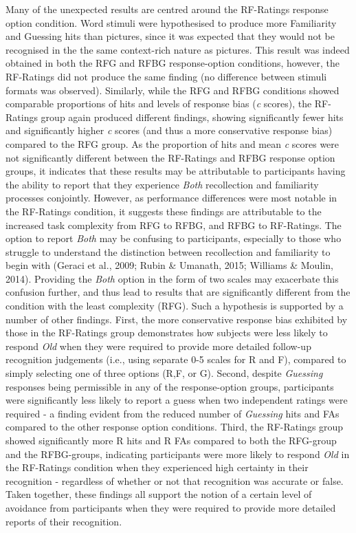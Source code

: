 \documentclass[
  11pt,
]{article}
\begin{document}
Many of the unexpected results are centred around the RF-Ratings
response option condition. Word stimuli were hypothesised to produce
more Familiarity and Guessing hits than pictures, since it was expected
that they would not be recognised in the the same context-rich nature as
pictures. This result was indeed obtained in both the RFG and RFBG
response-option conditions, however, the RF-Ratings did not produce the
same finding (no difference between stimuli formats was observed).
Similarly, while the RFG and RFBG conditions showed comparable
proportions of hits and levels of response bias (\emph{c} scores), the
RF-Ratings group again produced different findings, showing
significantly fewer hits and significantly higher \emph{c} scores (and
thus a more conservative response bias) compared to the RFG group. As
the proportion of hits and mean \emph{c} scores were not significantly
different between the RF-Ratings and RFBG response option groups, it
indicates that these results may be attributable to participants having
the ability to report that they experience \emph{Both} recollection and
familiarity processes conjointly. However, as performance differences
were most notable in the RF-Ratings condition, it suggests these
findings are attributable to the increased task complexity from RFG to
RFBG, and RFBG to RF-Ratings. The option to report \emph{Both} may be
confusing to participants, especially to those who struggle to
understand the distinction between recollection and familiarity to begin
with (Geraci et al., 2009; Rubin \& Umanath, 2015; Williams \& Moulin,
2014). Providing the \emph{Both} option in the form of two scales may
exacerbate this confusion further, and thus lead to results that are
significantly different from the condition with the least complexity
(RFG). Such a hypothesis is supported by a number of other findings.
First, the more conservative response bias exhibited by those in the
RF-Ratings group demonstrates how subjects were less likely to respond
\emph{Old} when they were required to provide more detailed follow-up
recognition judgements (i.e., using separate 0-5 scales for R and F),
compared to simply selecting one of three options (R,F, or G). Second,
despite \emph{Guessing} responses being permissible in any of the
response-option groups, participants were significantly less likely to
report a guess when two independent ratings were required - a finding
evident from the reduced number of \emph{Guessing} hits and FAs compared
to the other response option conditions. Third, the RF-Ratings group
showed significantly more R hits and R FAs compared to both the
RFG-group and the RFBG-groups, indicating participants were more likely
to respond \emph{Old} in the RF-Ratings condition when they experienced
high certainty in their recognition - regardless of whether or not that
recognition was accurate or false. Taken together, these findings all
support the notion of a certain level of avoidance from participants
when they were required to provide more detailed reports of their
recognition.
\end{document}
